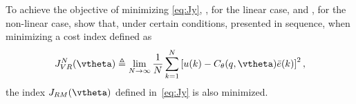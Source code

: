 
To achieve the objective of minimizing \eqref{eq:Jy}, \cite{campi2002}, for the linear case, and \cite{campi2006}, for the non-linear case, show that, under certain conditions, presented in sequence, when minimizing a cost index defined as
\begin{equation}
   J_{VR}^N(\vtheta) \triangleq \lim_{N \to \infty}  \frac{1}{N} \sum_{k=1}^N \left[u(k) - C_\theta(q,\vtheta)\bar{e}(k)\right]^2
   \label{eq:Jvr},
\end{equation}
the index $J_{RM}(\vtheta)$ defined in~\eqref{eq:Jy} is also minimized.

